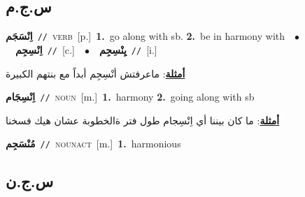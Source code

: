 \documentclass[10pt,a4paper,twoside]{article} %
\begin{document}
\begin{multicols}{2}
\vspace{-3mm}
\subsection*{\color{blue}\foreignlanguage{arabic}{س.ج.م}\color{blue}{}} 

{\setlength\topsep{0pt}\textbf{\foreignlanguage{arabic}{اِنْسَجَم}}\ {\color{gray}\texttt{//}\color{black}}\ \textsc{verb}\ [p.]\ \textbf{1.}~go along with sb.  \textbf{2.}~be in harmony with\ \ $\bullet$\ \ \setlength\topsep{0pt}\textbf{\foreignlanguage{arabic}{اِنْسِجِم}}\ {\color{gray}\texttt{//}\color{black}}\ [c.]\ \ $\bullet$\ \ \setlength\topsep{0pt}\textbf{\foreignlanguage{arabic}{يِنْسِجِم}}\ {\color{gray}\texttt{//}\color{black}}\ [i.]\  \begin{flushright}\color{gray}\foreignlanguage{arabic}{\textbf{\underline{\foreignlanguage{arabic}{أمثلة}}}: ماعرفتش أنْسِجِم أبداً مع بنتهم الكبيرة}\end{flushright}\color{black}} \vspace{2mm}

{\setlength\topsep{0pt}\textbf{\foreignlanguage{arabic}{اِنْسِجَام}}\ {\color{gray}\texttt{//}\color{black}}\ \textsc{noun}\ [m.]\ \textbf{1.}~harmony  \textbf{2.}~going along with sb\  \begin{flushright}\color{gray}\foreignlanguage{arabic}{\textbf{\underline{\foreignlanguage{arabic}{أمثلة}}}: ما كان بيننا أي اِنْسِجام طول فتر ةالخطوبة عشان هيك فسخنا}\end{flushright}\color{black}} \vspace{2mm}

{\setlength\topsep{0pt}\textbf{\foreignlanguage{arabic}{مُنْسَجِم}}\ {\color{gray}\texttt{//}\color{black}}\ \textsc{noun\textunderscore act}\ [m.]\ \textbf{1.}~harmonious\ } \vspace{2mm}

\vspace{-3mm}
\subsection*{\color{blue}\foreignlanguage{arabic}{س.ج.ن}\color{blue}{}} 


\end{multicols}
\end{document}
